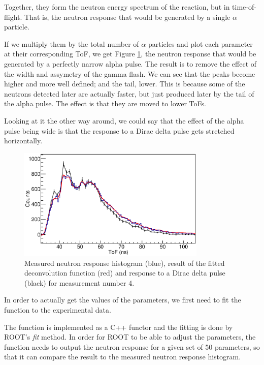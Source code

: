 \documentclass[a4paper,12pt]{report}
\begin{document}
Together, they form the neutron energy spectrum of the reaction, but in time-of-flight.
That is, the neutron response that would be generated by a single $\alpha$ particle.

If we multiply them by the total number of $\alpha$ particles and plot each parameter at their corresponding ToF, we get Figure \ref{pulsed_deconvolution_delta}, the neutron response that would be generated by a perfectly narrow alpha pulse.
The result is to remove the effect of the width and assymetry of the gamma flash.
We can see that the peaks become higher and more well defined; and the tail, lower.
This is because some of the neutrons detected later are actually faster, but just produced later by the tail of the alpha pulse.
The effect is that they are moved to lower ToFs.

Looking at it the other way around, we could say that the effect of the alpha pulse being wide is that the response to a Dirac delta pulse gets stretched horizontally.
\\

\begin{figure}[H]
	\centering
	\includegraphics[width=0.80\textwidth]{pulsed_deconvolution_delta.eps}
	\caption{Measured neutron response histogram (blue), result of the fitted deconvolution function (red) and response to a Dirac delta pulse (black) for measurement number 4.}
	\label{pulsed_deconvolution_delta}
\end{figure}

In order to actually get the values of the parameters, we first need to fit the function to the experimental data.

The function is implemented as a C++ functor and the fitting is done by ROOT's \textit{fit} method.
In order for ROOT to be able to adjust the parameters, the function needs to output the neutron response for a given set of 50 parameters, so that it can compare the result to the measured neutron response histogram.
\end{document}
